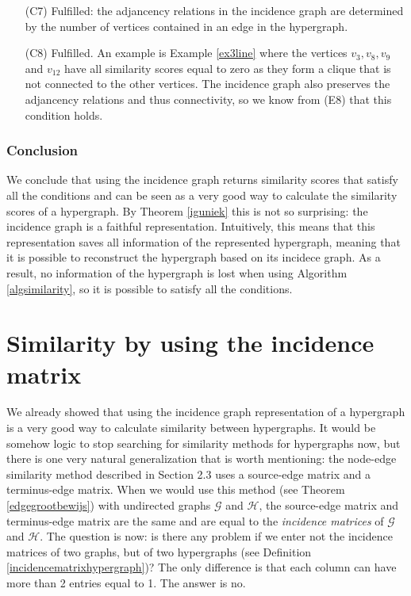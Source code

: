 \documentclass[a4paper,11pt]{report}
\newcommand{\graf}{\mathscr{G}}
\newcommand{\grafeen}{\mathscr{H}}
\begin{document}
\begin{itemize}
  \item[(C7)] Fulfilled: the adjancency relations in the incidence graph are determined by the number of vertices
  contained in an edge in the hypergraph.
    \item[(C8)] Fulfilled. An example is Example \ref{ex3line} where the 
    vertices $v_3, v_8, v_9$ and $v_12$ have all similarity scores equal to zero 
    as they form a clique that is not connected to the other vertices. The 
    incidence graph also preserves the adjancency relations and thus 
    connectivity, so we know from (E8) that this condition holds.
  \end{itemize}  
  \subsubsection{Conclusion}
  We conclude that using the incidence graph returns similarity scores that 
  satisfy all the conditions and can be seen as a very good way to calculate the 
  similarity scores of a hypergraph. By Theorem \ref{iguniek} this is not so 
  surprising: the incidence graph is a faithful representation. Intuitively, 
  this means that this representation saves all information of the represented 
  hypergraph, meaning that it is possible to reconstruct the hypergraph based on 
  its incidece graph. As a result, no information of the hypergraph is lost when using Algorithm \ref{algsimilarity},
  so it is possible to satisfy all the conditions. 

\newpage
  \section{Similarity by using the incidence matrix}

We already showed that using the incidence graph representation of a hypergraph
is a very good way to calculate similarity between hypergraphs. It would be somehow logic to stop searching for similarity methods
for hypergraphs now, but there is one very natural generalization that is worth mentioning: the node-edge similarity 
method described in Section 2.3 uses a source-edge matrix and a terminus-edge 
matrix. When we would use this method (see Theorem \ref{edgegrootbewijs}) with undirected graphs $\graf$ and $\grafeen$, the source-edge matrix and terminus-edge
matrix are the same and are equal to the \textit{incidence matrices} of $\graf$ and 
$\grafeen$. The question is now: is there any problem if we enter not the incidence matrices of two graphs, but of 
two hypergraphs (see Definition \ref{incidencematrixhypergraph})? The only difference is that each
column can have more than 2 entries equal to 1. The answer is 
no. 
\end{document}
